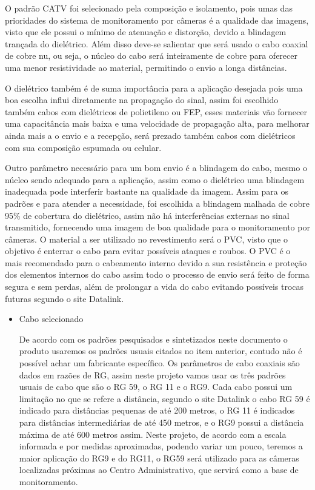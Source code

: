 	O padrão CATV foi selecionado pela composição e isolamento, pois umas das prioridades do sistema de monitoramento por câmeras é a qualidade das imagens, visto que ele possui o mínimo de atenuação e distorção, devido a blindagem trançada do dielétrico. Além disso deve-se salientar que será usado o cabo coaxial de cobre nu, ou seja, o núcleo do cabo será inteiramente de cobre para oferecer uma menor resistividade ao material, permitindo o envio a longa distâncias. 

	O dielétrico também é de suma importância para a aplicação desejada pois uma boa escolha influi diretamente na propagação do sinal, assim foi escolhido também cabos com dielétricos de polietileno ou FEP, esses materiais vão fornecer uma capacitância mais baixa e uma velocidade de propagação alta, para melhorar ainda mais a o envio e a recepção, será prezado também cabos com dielétricos com sua composição espumada ou celular.

	Outro parâmetro necessário para um bom envio é a blindagem do cabo, mesmo o núcleo sendo adequado para a aplicação, assim como o dielétrico uma blindagem inadequada pode interferir bastante na qualidade da imagem. Assim para os padrões e para atender a necessidade, foi escolhida a blindagem malhada de cobre 95\% de cobertura do dielétrico, assim não há interferências externas no sinal transmitido, fornecendo uma imagem de boa qualidade para o monitoramento por câmeras.
	O material a ser utilizado no revestimento será o PVC, visto que o objetivo é enterrar o cabo para evitar possíveis ataques e roubos. O PVC é o mais recomendado para o cabeamento interno devido a sua resistência e proteção dos elementos internos do cabo assim todo o processo de envio será feito de forma segura e sem perdas, além de prolongar a vida do cabo evitando possíveis trocas futuras segundo o site Datalink. 

\begin{itemize}
	\item Cabo selecionado
	
	De acordo com os padrões pesquisados e sintetizados neste documento o produto usaremos os padrões usuais citados no item anterior, contudo não é possível achar um fabricante específico. Os parâmetros de cabo coaxiais são dados em razões de RG, assim neste projeto vamos usar os três padrões usuais de cabo que são o RG 59, o RG 11 e o RG9. Cada cabo possui um limitação no que se refere a distância, segundo o site Datalink o cabo  RG 59 é indicado para distâncias pequenas de até 200 metros, o RG 11 é indicados para distâncias intermediárias de até 450 metros, e o RG9 possui  a distância máxima de até 600 metros assim. Neste projeto, de acordo com a escala informada e por medidas aproximadas, podendo variar um pouco, teremos a maior aplicação do RG9 e do RG11, o RG59 será utilizado para as câmeras localizadas próximas  ao Centro Administrativo, que servirá como a base de monitoramento.
	
\end{itemize}

